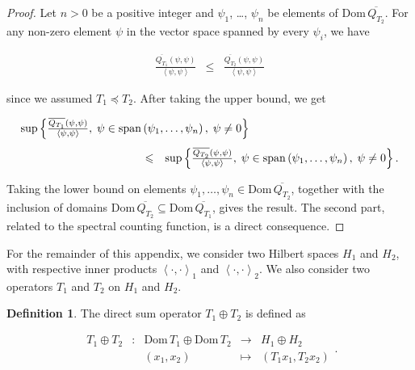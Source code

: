 \documentclass{jams-l}
\theoremstyle{definition}
\newtheorem{definition}[theorem]{Definition}
\theoremstyle{remark}
\numberwithin{equation}{section}
\begin{document}
        \begin{proof}
        
            Let $n > 0$ be a positive integer and $\psi_1$, \dots, $\psi_n$ be elements of $\mathrm{Dom} \, \overline{Q_{T_2}}$. For any non-zero element $\psi$ in the vector space spanned by every $\psi_i$, we have
            
            \[ \begin{array}{lll}
                    \frac{\overline{Q_{T_1}} \left( \psi, \psi \right)}{\left< \psi, \psi \right>} & \leqslant & \frac{\overline{Q_{T_2}} \left( \psi, \psi \right)}{\left< \psi, \psi \right>}
                \end{array} \]
            
            \noindent since we assumed $T_1 \preccurlyeq T_2$. After taking the upper bound, we get
            
            \[ \begin{array}{lll}
                    \multicolumn{3}{l}{\sup \left \{ \frac{\overline{Q_{T_1}} \left( \psi, \psi \right)}{\left< \psi, \psi \right>}, \; \psi \in \mathrm{span} \left( \psi_1, \dots, \psi_n \right), \; \psi \neq 0 \right \}} \\[1em]
                    
                    \qquad \qquad \qquad \qquad \qquad & \leqslant & \sup \left \{ \frac{\overline{Q_{T_2}} \left( \psi, \psi \right)}{\left< \psi, \psi \right>}, \; \psi \in \mathrm{span} \left( \psi_1, \dots, \psi_n \right), \; \psi \neq 0 \right \}.
                \end{array} \]
            
            \noindent Taking the lower bound on elements $\psi_1, \dots, \psi_n \in \mathrm{Dom} \, \overline{Q_{T_2}}$, together with the inclusion of domains $\mathrm{Dom} \, \overline{Q_{T_2}} \subseteq \mathrm{Dom} \, \overline{Q_{T_1}}$, gives the result. The second part, related to the spectral counting function, is a direct consequence.
        
        \end{proof}
        
        For the remainder of this appendix, we consider two Hilbert spaces $H_1$ and $H_2$, with respective inner products $\left< \cdot, \cdot \right>_1$ and $\left< \cdot, \cdot \right>_2$. We also consider two operators $T_1$ and $T_2$ on $H_1$ and $H_2$.
        
        \begin{definition}
        
            The direct sum operator $T_1 \oplus T_2$ is defined as
            
            \[ \begin{array}{lllll}
                    T_1 \oplus T_2 & : & \mathrm{Dom} \, T_1 \oplus \mathrm{Dom} \, T_2 & \longrightarrow & H_1 \oplus H_2 \\[0.5em]
                    && \left( x_1, x_2 \right) & \longmapsto & \left( T_1 x_1, T_2 x_2 \right)
                \end{array} . \]
        
        \end{definition}
        
\end{document}
